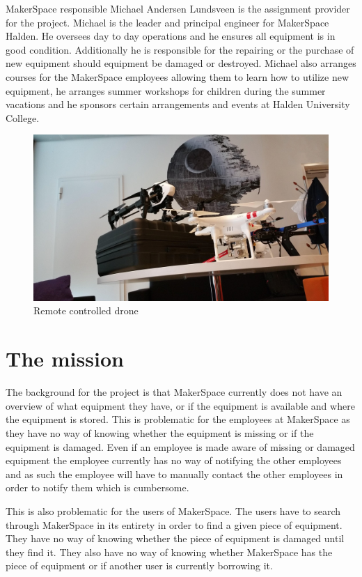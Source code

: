 MakerSpace responsible Michael Andersen Lundsveen is the assignment provider for the project. 
Michael is the leader and principal engineer for MakerSpace Halden.
He oversees day to day operations and he ensures all equipment is in good condition.
Additionally he is responsible for the repairing or the purchase of new equipment should equipment be damaged or destroyed.
Michael also arranges courses for the MakerSpace employees allowing them to learn how to utilize new equipment, he arranges summer workshops for children during the summer vacations and he sponsors certain arrangements and events at Halden University College.

\begin{figure}
    \centering
    \includegraphics[width=115mm,scale=1]{figures/makerspace.png}
    \caption{Remote controlled drone}
    \label{fig:makerspace}
\end{figure}

\section{The mission}
The background for the project is that MakerSpace currently does not have an overview of what equipment they have, or if the equipment is available and where the equipment is stored.
This is problematic for the employees at MakerSpace as they have no way of knowing whether the equipment is missing or if the equipment is damaged.
Even if an employee is made aware of missing or damaged equipment the employee currently has no way of notifying the other employees and as such the employee will have to manually contact the other employees in order to notify them which is cumbersome.

This is also problematic for the users of MakerSpace.
The users have to search through MakerSpace in its entirety in order to find a given piece of equipment.
They have no way of knowing whether the piece of equipment is damaged until they find it.
They also have no way of knowing whether MakerSpace has the piece of equipment or if another user is currently borrowing it.

